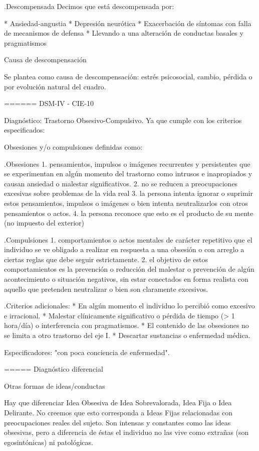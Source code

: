 \documentclass[encares.tex]{subfiles}
\begin{document}
.Descompensada
Decimos que está descompensada por:

* Ansiedad-angustia
* Depresión neurótica
* Exacerbación de síntomas con falla de mecanismos de defensa
* Llevando a una alteración de conductas basales y pragmatismos

Causa de descompensación

Se plantea como causa de descompensación: estrés psicosocial, cambio, pérdida o por evolución natural del cuadro.

====== DSM-IV - CIE-10

Diagnóstico: Trastorno Obsesivo-Compulsivo. Ya que cumple con los criterios especificados:

Obsesiones y/o compulsiones definidas como:

.Obsesiones
1. pensamientos, impulsos o imágenes recurrentes y persistentes que se experimentan en algún momento del trastorno como intrusos e inapropiados y causan ansiedad o malestar significativos.
2. no se reducen a preocupaciones excesivas sobre problemas de la vida real
3. la persona intenta ignorar o suprimir estos pensamientos, impulsos o imágenes o bien intenta neutralizarlos con otros pensamientos o actos.
4. la persona reconoce que esto es el producto de su mente (no impuesto del exterior)

.Compulsiones
1. comportamientos o actos mentales de carácter repetitivo que el individuo se ve obligado a realizar en respuesta a una obsesión o con arreglo a ciertas reglas que debe seguir estrictamente.
2. el objetivo de estos comportamientos es la prevención o reducción del malestar o prevención de algún acontecimiento o situación negativos, sin estar conectados en forma realista con aquello que pretenden neutralizar o bien son claramente excesivos.

.Criterios adicionales:
* En algún momento el individuo lo percibió como excesivo e irracional.
* Malestar clínicamente significativo o pérdida de tiempo (> 1 hora/día) o interferencia con pragmatismos.
* El contenido de las obsesiones no se limita a otro trastorno del eje I.
* Descartar sustancias o enfermedad médica.

Especificadores: "con poca conciencia de enfermedad".

===== Diagnóstico diferencial

Otras formas de ideas/conductas

Hay que diferenciar Idea Obsesiva de Idea Sobrevalorada, Idea Fija o Idea Delirante. No creemos que esto corresponda a Ideas Fijas relacionadas con preocupaciones reales del sujeto. Son intensas y constantes como las ideas obsesivas, pero a diferencia de éstas el individuo no las vive como extrañas (son egosintónicas) ni patológicas.
\end{document}
